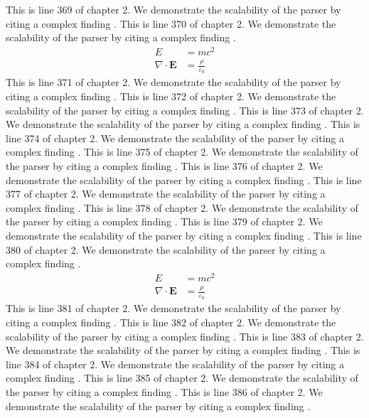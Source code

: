 This is line 369 of chapter 2. We demonstrate the scalability of the parser by citing a complex finding \cite{ref2_369}.
This is line 370 of chapter 2. We demonstrate the scalability of the parser by citing a complex finding \cite{ref2_370}.
\begin{align*}
  E &= mc^2 \\
  \nabla \cdot \mathbf{E} &= \frac{\rho}{\varepsilon_0}
\end{align*}
This is line 371 of chapter 2. We demonstrate the scalability of the parser by citing a complex finding \cite{ref2_371}.
This is line 372 of chapter 2. We demonstrate the scalability of the parser by citing a complex finding \cite{ref2_372}.
This is line 373 of chapter 2. We demonstrate the scalability of the parser by citing a complex finding \cite{ref2_373}.
This is line 374 of chapter 2. We demonstrate the scalability of the parser by citing a complex finding \cite{ref2_374}.
This is line 375 of chapter 2. We demonstrate the scalability of the parser by citing a complex finding \cite{ref2_375}.
This is line 376 of chapter 2. We demonstrate the scalability of the parser by citing a complex finding \cite{ref2_376}.
This is line 377 of chapter 2. We demonstrate the scalability of the parser by citing a complex finding \cite{ref2_377}.
This is line 378 of chapter 2. We demonstrate the scalability of the parser by citing a complex finding \cite{ref2_378}.
This is line 379 of chapter 2. We demonstrate the scalability of the parser by citing a complex finding \cite{ref2_379}.
This is line 380 of chapter 2. We demonstrate the scalability of the parser by citing a complex finding \cite{ref2_380}.
\begin{align*}
  E &= mc^2 \\
  \nabla \cdot \mathbf{E} &= \frac{\rho}{\varepsilon_0}
\end{align*}
This is line 381 of chapter 2. We demonstrate the scalability of the parser by citing a complex finding \cite{ref2_381}.
This is line 382 of chapter 2. We demonstrate the scalability of the parser by citing a complex finding \cite{ref2_382}.
This is line 383 of chapter 2. We demonstrate the scalability of the parser by citing a complex finding \cite{ref2_383}.
This is line 384 of chapter 2. We demonstrate the scalability of the parser by citing a complex finding \cite{ref2_384}.
This is line 385 of chapter 2. We demonstrate the scalability of the parser by citing a complex finding \cite{ref2_385}.
This is line 386 of chapter 2. We demonstrate the scalability of the parser by citing a complex finding \cite{ref2_386}.
